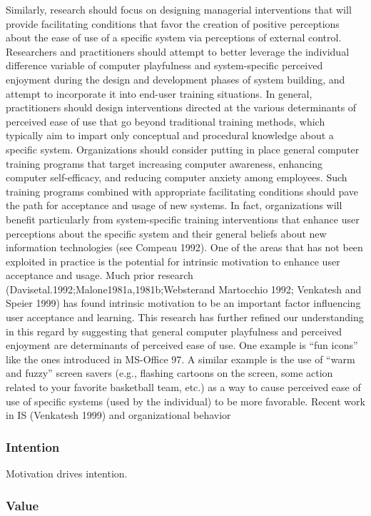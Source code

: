 {Similarly, research should focus on designing managerial interventions that will provide facilitating conditions that favor the creation of positive perceptions about the ease of use of a specific system via perceptions of external control. Researchers and practitioners should attempt to better leverage the individual difference variable of computer playfulness and system-specific perceived enjoyment during the design and development phases of system building, and attempt to incorporate it into end-user training situations. In general, practitioners should design interventions directed at the various determinants of perceived ease of use that go beyond traditional training methods, which typically aim to impart only conceptual and procedural knowledge about a specific system. Organizations should consider putting in place general computer training programs that target increasing computer awareness, enhancing computer self-efficacy, and reducing computer anxiety among employees. Such training programs combined with appropriate facilitating conditions should pave the path for acceptance and usage of new systems. In fact, organizations will benefit particularly from system-specific training interventions that enhance user perceptions about the specific system and their general beliefs about new information technologies (see Compeau 1992).
One of the areas that has not been exploited in practice is the potential for intrinsic motivation to enhance user acceptance and usage. Much prior research (Davisetal.1992;Malone1981a,1981b;Websterand Martocchio 1992; Venkatesh and Speier 1999) has found intrinsic motivation to be an important factor influencing user acceptance and learning. This research has further refined our understanding in this regard by suggesting that general computer playfulness and perceived enjoyment are determinants of perceived ease of use. One example is “fun icons” like the ones introduced in MS-Office 97. A similar example is the use of “warm and fuzzy” screen savers (e.g., flashing cartoons on the screen, some action related to your favorite basketball team, etc.) as a way to cause perceived ease of use of specific systems (used by the individual) to be more favorable. Recent work in IS (Venkatesh 1999) and organizational behavior}

\subsubsection{Intention}
Motivation drives intention.

\subsubsection{Value}


